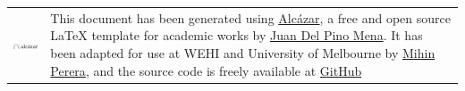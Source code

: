 



\begingroup

    \vspace*{2mm}

    \setlength\tabcolsep{0pt}
    \renewcommand*{\arraystretch}{1.4}
    \renewcommand{\baselinestretch}{0.9}\footnotesize  %
    
    \noindent
    \begin{tabular}{m{3.5cm} m{11.5cm}}
        \includegraphics[width=3cm]{opening/resources/logos/alcazar.pdf} & \noindent This document has been generated using {\href{https://github.com/dpmj/alcazar}{Alcázar}}, a free and open source {\LaTeX} template for academic works by \href{https://www.linkedin.com/in/dpmj/}{Juan Del Pino Mena}. It has been adapted for use at WEHI and University of Melbourne by \href{https://www.linkedin.com/in/mihinperera1040/}{Mihin Perera}, and the source code is freely available at {\href{https://github.com/dpmj/alcazar}{GitHub}} \\
    \end{tabular}

    

\endgroup


